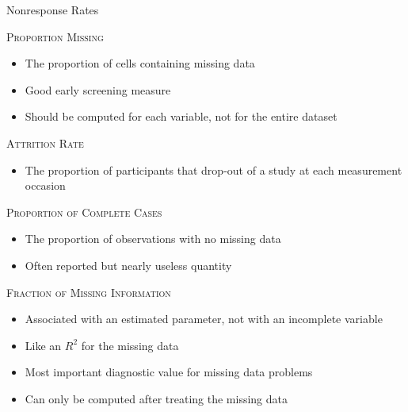 \documentclass{beamer}\usepackage[]{graphicx}\usepackage[]{color}
\newcommand{\rmsc}[1]{\textrm{\textsc{#1}}}
\begin{document}
\begin{frame}[allowframebreaks]{Nonresponse Rates}

  \rmsc{Proportion Missing}
  \begin{itemize}
  \item The proportion of cells containing missing data
  \item Good early screening measure
  \item Should be computed for each variable, not for the entire dataset
  \end{itemize}

  \va

  \rmsc{Attrition Rate}
  \begin{itemize}
  \item The proportion of participants that drop-out of a study at each
    measurement occasion
  \end{itemize}

  \pagebreak

  \rmsc{Proportion of Complete Cases}
  \begin{itemize}
  \item The proportion of observations with no missing data
  \item Often reported but nearly useless quantity
  \end{itemize}

  \va

  \rmsc{Fraction of Missing Information}
  \begin{itemize}
  \item Associated with an estimated parameter, not with an incomplete variable
  \item Like an $R^2$ for the missing data
  \item Most important diagnostic value for missing data problems
  \item Can only be computed after treating the missing data
  \end{itemize}

\end{frame}

\end{document}
